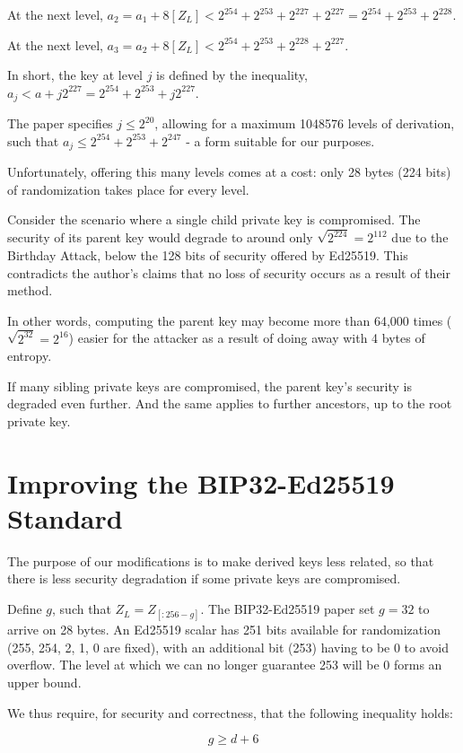 \documentclass[12pt, a4paper, twocolumn]{article}
\begin{document}
At the next level, $a_{2} = a_{1} + 8[Z_L] < 2^{254} + 2^{253} + 2^{227} + 2^{227} = 2^{254} + 2^{253} + 2^{228}$.

At the next level, $a_{3} = a_{2} + 8[Z_L] < 2^{254} + 2^{253} + 2^{228} + 2^{227}$.

In short, the key at level $j$ is defined by the inequality, $a_j < a + j2^{227} = 2^{254} + 2^{253} + j2^{227}$.

The paper specifies $j \leq 2^{20}$, allowing for a maximum 1048576 levels of derivation, such that $a_{j} \leq 2^{254} + 2^{253} + 2^{247}$ - a form suitable for our purposes.

Unfortunately, offering this many levels comes at a cost: only 28 bytes (224 bits) of randomization takes place for every level. 

Consider the scenario where a single child private key is compromised. The security of its parent key would degrade to around only $\sqrt{2^{224}}=2^{112}$ due to the Birthday Attack, below the 128 bits of security offered by Ed25519. This contradicts the author's claims that no loss of security occurs as a result of their method.

In other words, computing the parent key may become more than 64,000 times ($\sqrt{2^{32}}=2^{16}$) easier for the attacker as a result of doing away with 4 bytes of entropy.

If many sibling private keys are compromised, the parent key's security is degraded even further. And the same applies to further ancestors, up to the root private key.

\section{Improving the BIP32-Ed25519 Standard}

The purpose of our modifications is to make derived keys less related, so that there is less security degradation if some private keys are compromised.

Define $g$, such that $Z_L = Z_{[:256-g]}$. The BIP32-Ed25519 paper\cite{BIP32-Ed25519} set $g=32$ to arrive on 28 bytes. An Ed25519 scalar has 251 bits available for randomization (255, 254, 2, 1, 0 are fixed), with an additional bit (253) having to be 0 to avoid overflow. The level at which we can no longer guarantee 253 will be 0 forms an upper bound.

We thus require, for security and correctness, that the following inequality holds:

\begin{equation*}
  g \geq d + 6
\end{equation*}
\end{document}
